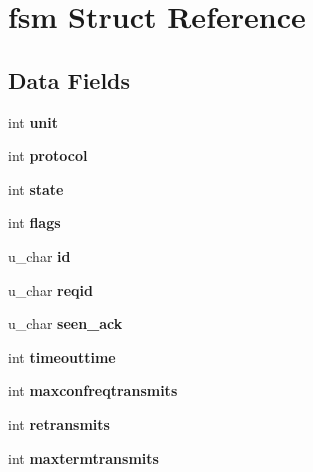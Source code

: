 \hypertarget{structfsm}{}\section{fsm Struct Reference}
\label{structfsm}
\subsection*{Data Fields}
\begin{DoxyCompactItemize}
\item 
\mbox{\label{structfsm_afa4d847e2e861b044c8a4a4ce3a75167}} 
int {\bfseries unit}
\item 
\mbox{\label{structfsm_a60188878d04f51f252b26bdf98e345d5}} 
int {\bfseries protocol}
\item 
\mbox{\label{structfsm_aabf417357938f1177fed5e48ecbdea64}} 
int {\bfseries state}
\item 
\mbox{\label{structfsm_a943443dd3a63df1c209faf1bc4cf9fc7}} 
int {\bfseries flags}
\item 
\mbox{\label{structfsm_a21d8a3c859b000ef8b06592c502543dc}} 
u\+\_\+char {\bfseries id}
\item 
\mbox{\label{structfsm_a29a4471cbb340ca79d0814b34ed8d77d}} 
u\+\_\+char {\bfseries reqid}
\item 
\mbox{\label{structfsm_ac0c40d25cca0dcdbc02572e215c743c7}} 
u\+\_\+char {\bfseries seen\+\_\+ack}
\item 
\mbox{\label{structfsm_a9deef1589652e3789c51c746dd1bcb37}} 
int {\bfseries timeouttime}
\item 
\mbox{\label{structfsm_ae7303effc5a2f4a63be817ab998acfa2}} 
int {\bfseries maxconfreqtransmits}
\item 
\mbox{\label{structfsm_a7b744b3fa6780d5fa4f7f7f6895b20c9}} 
int {\bfseries retransmits}
\item 
\mbox{\label{structfsm_ab3cd5e2bf84d72a04cb78308d4a3de81}} 
int {\bfseries maxtermtransmits}

\end{DoxyCompactItemize}
